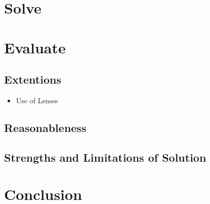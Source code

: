 \documentclass[11pt, letterpaper]{article}
\begin{document}
\section{Solve}

\par 


\section{Evaluate}

\subsection{Extentions}
\begin{itemize}
\item Use of Lenses	
	
\end{itemize}



\subsection{Reasonableness}


\subsection{Strengths and Limitations of Solution}


\section{Conclusion}


 
\end{document}
